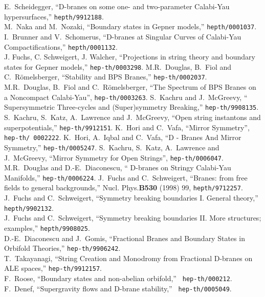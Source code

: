 \documentclass[a4paper,12pt]{article}
\begin{document}
\begin{thebibliography}{99}
E.~Scheidegger, ``D-branes on some one- and two-parameter Calabi-Yau
hypersurfaces,'' {\tt hepth/9912188}. \\
M.~Naka and M.~Nozaki, ``Boundary states in Gepner models,''
{\tt hepth/0001037}. \\
I.~Brunner and V.~Schomerus, ``D-branes at Singular Curves of Calabi-Yau
Compactifications,'' {\tt hepth/0001132}.\\
J. Fuchs, C. Schweigert, J. Walcher, ``Projections in string theory and
boundary states for Gepner models,'' {\tt hep-th/0003298}.
M.R.~Douglas, B.~Fiol and C.~R\"omelsberger,
``Stability and BPS Branes,'' {\tt hep-th/0002037}. \\
M.R.~Douglas, B.~Fiol and C.~R\"omelsberger,
``The Spectrum of BPS Branes on a Noncompact
Calabi-Yau'', {\tt hep-th/0003263}.
S.~Kachru and J.~McGreevy, `` Supersymmetric Three-cycles and 
(Super)symmetry Breaking,'' {\tt hep-th/9908135}. \\
S.~Kachru, S.~Katz, A.~Lawrence and J.~McGreevy, ``Open string
instantons and superpotentials,'' {\tt hep-th/9912151}.
 K.~Hori and C.~Vafa, ``Mirror Symmetry'', {\tt hep-th/
0002222}.
 K.~Hori, A.~Iqbal and C.~Vafa, ``D - Branes And Mirror
Symmetry,'' {\tt hep-th/0005247}.
 S.~Kachru, S.~Katz, A.~Lawrence and
J.~McGreevy, ``Mirror Symmetry for Open Strings'',
{\tt hep-th/0006047}.
 M.R.~Douglas and D.-E.~Diaconescu, ``
D-branes on Stringy Calabi-Yau Manifolds,'' {\tt hep-th/0006224}.
 J.~Fuchs and C.~Schweigert, ``Branes: from free fields to
general backgrounds,'' Nucl. Phys.{\bf B530} (1998) 99,   
{\tt hepth/9712257}. \\
J.~Fuchs and C.~Schweigert, ``Symmetry breaking
boundaries I. General theory,'' {\tt hepth/9902132}. \\
J.~Fuchs and C.~Schweigert, ``Symmetry breaking
boundaries II. More structures; examples,'' {\tt hepth/9908025}. \\
D.-E.~Diaconescu and J.~Gomis, ``Fractional Branes and
Boundary States in Orbifold Theories,'' {\tt hep-th/9906242}. \\
T.~Takayanagi, ``String Creation and Monodromy from Fractional D-branes
on ALE spaces,'' {\tt hep-th/9912157}.\\
F.~Roose, ``Boundary states and non-abelian orbifold,'' {\tt
hep-th/000212}.\\
F.~Denef, ``Supergravity flows and D-brane stability,'' {\tt
hep-th/0005049}. \\

\end{thebibliography}
\end{document}
